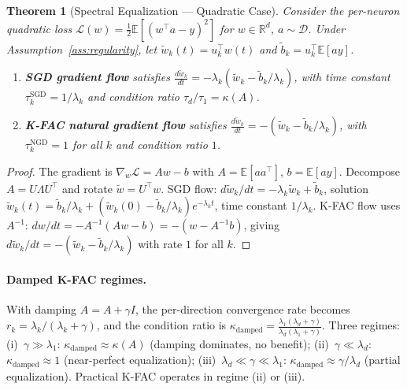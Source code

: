 \documentclass{article}
\providecommand{\R}{\mathbb{R}}
\providecommand{\E}{\mathbb{E}}
\theoremstyle{plain}
\newtheorem{theorem}{Theorem}
\theoremstyle{definition}
\theoremstyle{remark}
\begin{document}
\begin{theorem}[Spectral Equalization --- Quadratic Case]
\label{thm:spectral}
Consider the per-neuron quadratic loss $\mathcal{L}(w) = \frac{1}{2}\E[(w^\top a - y)^2]$ for $w \in \R^d$, $a \sim \mathcal{D}$. Under Assumption~\ref{ass:regularity}, let $\tilde{w}_k(t) = u_k^\top w(t)$ and $\tilde{b}_k = u_k^\top \E[ay]$.

\begin{enumerate}
    \item[(a)] \textbf{SGD gradient flow} satisfies $\frac{d\tilde{w}_k}{dt} = -\lambda_k(\tilde{w}_k - \tilde{b}_k/\lambda_k)$, with time constant $\tau_k^{\mathrm{SGD}} = 1/\lambda_k$ and condition ratio $\tau_d/\tau_1 = \kappa(A)$.
    
    \item[(b)] \textbf{K-FAC natural gradient flow} satisfies $\frac{d\tilde{w}_k}{dt} = -(\tilde{w}_k - \tilde{b}_k/\lambda_k)$, with $\tau_k^{\mathrm{NGD}} = 1$ for all $k$ and condition ratio $1$.
\end{enumerate}
\end{theorem}

\begin{proof}
The gradient is $\nabla_w\mathcal{L} = Aw - b$ with $A = \E[aa^\top]$, $b = \E[ay]$. Decompose $A = U\Lambda U^\top$ and rotate $\tilde{w} = U^\top w$. SGD flow: $d\tilde{w}_k/dt = -\lambda_k\tilde{w}_k + \tilde{b}_k$, solution $\tilde{w}_k(t) = \tilde{b}_k/\lambda_k + (\tilde{w}_k(0) - \tilde{b}_k/\lambda_k)e^{-\lambda_k t}$, time constant $1/\lambda_k$. K-FAC flow uses $A^{-1}$: $dw/dt = -A^{-1}(Aw - b) = -(w - A^{-1}b)$, giving $d\tilde{w}_k/dt = -(\tilde{w}_k - \tilde{b}_k/\lambda_k)$ with rate $1$ for all $k$.
\end{proof}

\paragraph{Damped K-FAC regimes.} With damping $\hat{A} = A + \gamma I$, the per-direction convergence rate becomes $r_k = \lambda_k/(\lambda_k + \gamma)$, and the condition ratio is $\kappa_{\mathrm{damped}} = \frac{\lambda_1(\lambda_d + \gamma)}{\lambda_d(\lambda_1 + \gamma)}$.
Three regimes: (i)~$\gamma \gg \lambda_1$: $\kappa_{\mathrm{damped}} \approx \kappa(A)$ (damping dominates, no benefit); (ii)~$\gamma \ll \lambda_d$: $\kappa_{\mathrm{damped}} \approx 1$ (near-perfect equalization); (iii)~$\lambda_d \ll \gamma \ll \lambda_1$: $\kappa_{\mathrm{damped}} \approx \gamma/\lambda_d$ (partial equalization). Practical K-FAC operates in regime (ii) or (iii).
\end{document}
